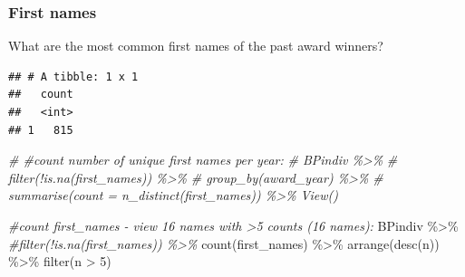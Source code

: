 \documentclass[
]{article}
\newenvironment{Shaded}{\begin{snugshade}}{\end{snugshade}}
\newcommand{\AttributeTok}[1]{\textcolor[rgb]{0.77,0.63,0.00}{#1}}
\newcommand{\CommentTok}[1]{\textcolor[rgb]{0.56,0.35,0.01}{\textit{#1}}}
\newcommand{\DecValTok}[1]{\textcolor[rgb]{0.00,0.00,0.81}{#1}}
\newcommand{\FunctionTok}[1]{\textcolor[rgb]{0.00,0.00,0.00}{#1}}
\newcommand{\NormalTok}[1]{#1}
\newcommand{\OtherTok}[1]{\textcolor[rgb]{0.56,0.35,0.01}{#1}}
\newcommand{\SpecialCharTok}[1]{\textcolor[rgb]{0.00,0.00,0.00}{#1}}
\begin{document}
\hypertarget{first-names}{%
\subsubsection{First names}\label{first-names}}

What are the most common first names of the past award winners?

\begin{Shaded}
\end{Shaded}

\begin{verbatim}
## # A tibble: 1 x 1
##   count
##   <int>
## 1   815
\end{verbatim}

\begin{Shaded}
\begin{Highlighting}[]
\CommentTok{\# \#count number of unique first names per year:}
\CommentTok{\# BPindiv \%\textgreater{}\% }
\CommentTok{\#   filter(!is.na(first\_names)) \%\textgreater{}\% }
\CommentTok{\#   group\_by(award\_year) \%\textgreater{}\% }
\CommentTok{\#   summarise(count = n\_distinct(first\_names)) \%\textgreater{}\% View()}


\CommentTok{\#count first\_names {-} view 16 names with \textgreater{}5 counts (16 names):}
\NormalTok{BPindiv }\SpecialCharTok{\%\textgreater{}\%} 
   \CommentTok{\#filter(!is.na(first\_names)) \%\textgreater{}\% }
   \FunctionTok{count}\NormalTok{(first\_names) }\SpecialCharTok{\%\textgreater{}\%} 
   \FunctionTok{arrange}\NormalTok{(}\FunctionTok{desc}\NormalTok{(n)) }\SpecialCharTok{\%\textgreater{}\%}
   \FunctionTok{filter}\NormalTok{(n }\SpecialCharTok{\textgreater{}} \DecValTok{5}\NormalTok{) }
\end{Highlighting}
\end{Shaded}
\end{document}
